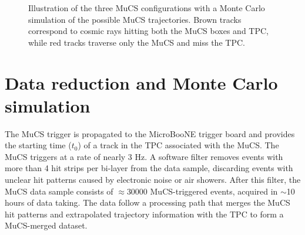 \documentclass[a4paper,11pt]{article}
\begin{document}
\begin{figure}[htbp]
  \caption{Illustration of the three MuCS configurations with a Monte Carlo simulation of the possible MuCS trajectories. Brown tracks correspond to cosmic rays hitting both the MuCS boxes and TPC, while red tracks traverse only the MuCS and miss the TPC.} \label{fig:mucs}
\end{figure}


\section{Data reduction and Monte Carlo simulation}\label{sec:merging}

The MuCS trigger is propagated to the MicroBooNE trigger board and provides the starting time ($t_0$) of a track in the TPC associated with the MuCS.
The MuCS triggers at a rate of nearly 3 Hz.
A software filter removes events with more than 4 hit strips per bi-layer from the data sample, discarding events with unclear hit patterns caused by electronic noise or air showers. After this filter, the MuCS data sample consists of $\approx$30000 MuCS-triggered events, acquired in $\sim$10 hours of data taking.
The data follow a processing path that merges the MuCS hit patterns and extrapolated trajectory information with the TPC to form a MuCS-merged dataset. %

\end{document}
